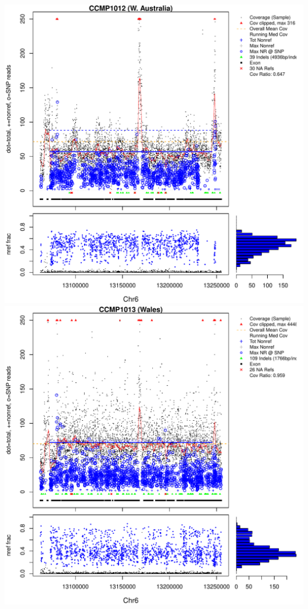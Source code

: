 \documentclass{article}\usepackage[]{graphicx}\usepackage[]{color}
\makeatletter
\def\maxwidth{ %
  \ifdim\Gin@nat@width>\linewidth
    \linewidth
  \else
    \Gin@nat@width
  \fi
}
\newenvironment{knitrout}{}{} %
\makeatother
\begin{document}
\begin{knitrout}
{\includegraphics[width=\maxwidth]{figs-knitr/unnamed-chunk-39-3} 
\includegraphics[width=\maxwidth]{figs-knitr/unnamed-chunk-39-4} 
}
\end{knitrout}
\end{document}
